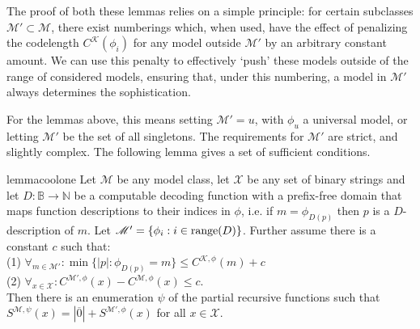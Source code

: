 \documentclass{style/llncs}
\newcommand{\M}{\mathscr M}
\newcommand{\K}{\mathscr K}
\newcommand{\X}{\mathscr X}
\newcommand{\B}{\mathbb B}
\newcommand{\N}{\mathbb N}
\newcommand{\tn}[1]{\textnormal{#1}}
\newcommand{\br}[1]{\overline{#1}}
\begin{document}
The proof of both these lemmas relies on a simple principle: for certain subclasses $\M' \subset \M$, there exist numberings which, when used, have the effect of penalizing the codelength $C^\K(\phi_i)$ for any model outside $\M'$ by an arbitrary constant amount. We can use this penalty to effectively `push' these models outside of the range of considered models, ensuring that, under this numbering, a model in $\M'$ always determines the sophistication.

For the lemmas above, this means setting $\M' = {u}$, with $\phi_u$ a universal model, or letting $\M'$ be the set of all singletons. The requirements for $\M'$ are strict, and slightly complex. The following lemma gives a set of sufficient conditions.

\begin{restatable}{lemma}{coolone}
\label{lemma:thecoolone}
  Let $\M$ be any model class, let $\X$ be any set of binary strings and let $D:\B\to\N$ be a computable decoding function with a prefix-free domain that maps function descriptions to their indices in $\phi$, i.e. if $m=\phi_{D(p)}$ then $p$ is a $D$-description of $m$. Let $\M'=\{\phi_i:i\in\tn{range}(D)\}$. Further assume there is a constant $c$ such that:\\
\-\hspace{1cm}(1) $\forall_{m\in\M'}:\min\{|p|:\phi_{D(p)}=m\}\le C^{\K,\phi}(m)+c$\\
\-\hspace{1cm}(2) $\forall_{x\in\X}:C^{\M',\phi}(x)-C^{\M,\phi}(x)\le c$.\\
Then there is an enumeration $\psi$ of the partial recursive functions such that $S^{\M,\psi}(x) = |\br{0}|+S^{\M',\phi}(x)$ for all $x\in\X$.
\end{restatable}
\end{document}
